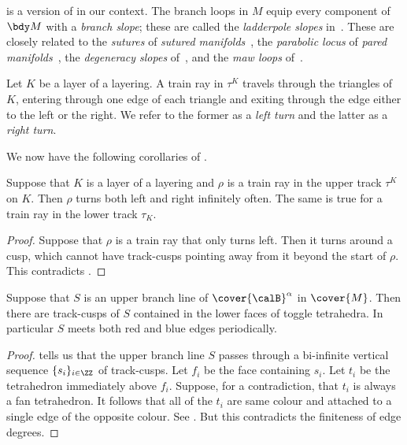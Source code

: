 \documentclass[12pt]{amsart}
\begin{document}
\begin{remark}
 is a version of \cite[Observation~2.3]{FuterGueritaud13} in our context.  The branch loops in $M$ equip every component of $\bdy M$ with a \emph{branch slope}; these are called the \emph{ladderpole slopes} in~\cite[Observation~2.4]{FuterGueritaud13}.  
These are closely related to the \emph{sutures} of \emph{sutured manifolds}~\cite[Definition~2.6]{Gabai83}, the \emph{parabolic locus} of \emph{pared manifolds}~\cite[Definition~4.8]{Morgan84}, the \emph{degeneracy slopes} of~\cite[page~62]{GabaiOertel89}, 
and the \emph{maw loops} of~\cite[page~27]{Mosher96}.
\end{remark}

\begin{definition}
Let $K$ be a layer of a layering. A train ray in $\tau^K$ travels through the triangles of $K$, entering through one edge of each triangle and exiting through the edge either to the left or the right.  We refer to the former as a \emph{left turn} and the latter as a \emph{right turn}. 
\end{definition}

We now have the following corollaries of .

\begin{corollary}
\label{Cor:CannotTurnLeftForever}
Suppose that $K$ is a layer of a layering and $\rho$ is a train ray in the upper track $\tau^K$ on $K$.  Then $\rho$ turns both left and right infinitely often.  The same is true for a train ray in the lower track $\tau_K$. 
\end{corollary}
\begin{proof}
Suppose that $\rho$ is a train ray that only turns left. Then it turns around a cusp, which cannot have track-cusps pointing away from it beyond the start of $\rho$. This contradicts .
\end{proof}

\begin{corollary}
\label{Cor:BranchLinesToggle}
Suppose that $S$ is an upper branch line of $\cover{\calB}^\alpha$ in $\cover{M}$.  Then there are track-cusps of $S$ contained in the lower faces of toggle tetrahedra.  In particular $S$ meets both red and blue edges periodically. 
\end{corollary}

\begin{proof}
 tells us that the upper branch line $S$ passes through a bi-infinite vertical sequence $\{s_i\}_{i \in \ZZ}$ of track-cusps.  
Let $f_i$ be the face containing $s_i$.  Let $t_i$ be the tetrahedron immediately above $f_i$.  Suppose, for a contradiction, that $t_i$ is always a fan tetrahedron.  It follows that all of the $t_i$ are same colour and attached to a single edge of the opposite colour.  See .  But this contradicts the finiteness of edge degrees. 
\end{proof}
\end{document}
